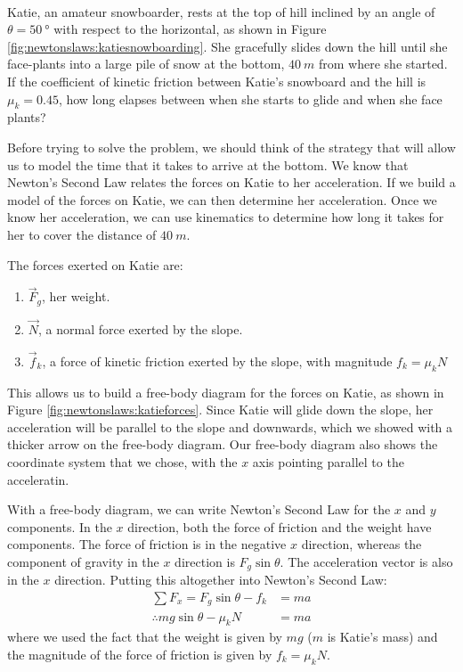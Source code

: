 \begin{problem}\\ Katie, an amateur snowboarder, rests at the top of hill inclined by an angle of $\theta =\SI{50}{\degree}$ with respect to the horizontal, as shown in Figure \ref{fig:newtonslaws:katiesnowboarding}. She gracefully slides down the hill until she face-plants into a large pile of snow at the bottom, $\SI{40}{m}$ from where she started. If the coefficient of kinetic friction between Katie's snowboard and the hill is $\mu_k=0.45$, how long elapses between when she starts to glide and when she face plants?


Before trying to solve the problem, we should think of the strategy that will allow us to model the time that it takes to arrive at the bottom. We know that Newton's Second Law relates the forces on Katie to her acceleration. If we build a model of the forces on Katie, we can then determine her acceleration. Once we know her acceleration, we can use kinematics to determine how long it takes for her to cover the distance of $\SI{40}{m}$.

The forces exerted on Katie are:
\begin{enumerate}
\item $\vec F_g$, her weight.
\item $\vec N$, a normal force exerted by the slope.
\item $\vec f_k$, a force of kinetic friction exerted by the slope, with magnitude $f_k=\mu_kN$ 
\end{enumerate}

This allows us to build a free-body diagram for the forces on Katie, as shown in Figure \ref{fig:newtonslaws:katieforces}. Since Katie will glide down the slope, her acceleration will be parallel to the slope and downwards, which we showed with a thicker arrow on the free-body diagram. Our free-body diagram also shows the coordinate system that we chose, with the $x$ axis pointing parallel to the acceleratin. 


With a free-body diagram, we can write Newton's Second Law for the $x$ and $y$ components. In the $x$ direction, both the force of friction and the weight have components. The force of friction is in the negative $x$ direction, whereas the component of gravity in the $x$ direction is $F_g\sin\theta$. The acceleration vector is also in the $x$ direction. Putting this altogether into Newton's Second Law:
\begin{align*}
\sum F_x = F_g\sin\theta - f_k &= ma\\
\therefore mg\sin\theta -\mu_k N &= ma
\end{align*}
where we used the fact that the weight is given by $mg$ ($m$ is Katie's mass) and the magnitude of the force of friction is given by $f_k=\mu_kN$.


\end{problem}
